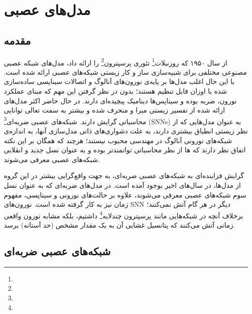 \chapter{مدل‌های عصبی}
\section{مقدمه}
از سال ۱۹۵۰ که روزنبلات\footnote{} تئوری پرسپترون\footnote{}  را ارائه داد\cite{rosenblatt1958perceptron}، مدل‌های شبکه عصبی مصنوعی مختلفی برای شبیه‌سازی ساز و کار زیستی شبکه‌های عصبی ارائه شده است. با این حال اغلب مدل‌ها بر پایه‌ی نورون‌های آنالوگ و اتصالات سیناپسی ساده‌سازی شده با اوزان قابل تنظیم هستند؛ بدون در نظر گرفتن این مهم که مبنای عملکرد نورون، ضربه بوده و سیناپس‌ها دینامیک پیچیده‌ای دارند. در حال حاضر اکثر مدل‌های ارائه شده از تفسیر زیستی مبرا و منحرف شده و بیشتر به سمت تعالی توانایی محاسباتی گرایش دارند. شبکه‌های عصبی ضربه‌ای\footnote{} (SNNs) به عنوان مدل‌هایی که از نظر زیستی انطباق بیشتری دارند، به علت دشواری‌های ذاتی مدل‌سازی آنها، به اندازه‌ی شبکه‌های نورونی آنالوگ در مهندسی محبوب نیستند؛ هرچند که همگان بر این نکته اتفاق نظر دارند که ها از نظر محاسباتی توانمند‌تر بوده و به عنوان نسل جدید و انقلابی شبکه‌های عصبی معرفی می‌شوند\cite{ghosh2009spiking}.

گرایش فزاینده‌ای به شبکه‌های عصبی ضربه‌ای، به جهت واقع‌گرایی بیشتر در این گروه از مدل‌ها، در سال‌های اخیر بوجود آمده است. در مدل‌های ضربه‌ای که به عنوان نسل سوم شبکه‌های عصبی معرفی می‌شوند، علاوه بر حالت‌های نورونی و سیناپسی، مفهوم زمان نیز به کار گرفته شده است. نورون‌های SNN دیگر در هر گام آتش نمی‌کنند؛ برخلاف آنچه در شبکه‌هایی مانند پرسپترون چندلایه\footnote{} داشتیم، بلکه مشابه نورون واقعی زمانی آتش می‌کنند که پتانسیل غشایی آن به یک مقدار مشخص (حد آستانه) برسد. 

\section{شبکه‌های عصبی ضربه‌ای}
